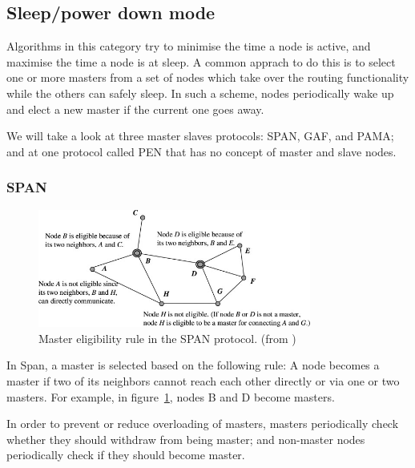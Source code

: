 \subsection{Sleep/power­ down mode}
Algorithms in this category try to minimise the time a node is active, and
maximise the time a node is at sleep. A common apprach to do this is to select
one or more masters from a set of nodes which take over the routing functionality
while the others can safely sleep. In such a scheme, nodes periodically wake up
and elect a new master if the current one goes away.

We will take a look at three master slaves protocols: SPAN, GAF, and PAMA;
and at one protocol called PEN that has no concept of master and slave nodes.

\subsubsection{SPAN}
\begin{figure}
\centering
\includegraphics[width=0.8\textwidth]{images/span-master-example}
\caption{Master eligibility rule in the SPAN protocol. (from \cite{alotaibi2012survey})}
\label{spanmaster}
\end{figure}
In Span\cite{chen2002span}, a master is selected based on the following rule:
A node becomes a master if two of its neighbors cannot reach each other directly
or via one or two masters. For example, in figure~\ref{spanmaster}, nodes B and
D become masters.

In order to prevent or reduce overloading of masters, masters periodically
check whether they should withdraw from being master; and non-master nodes
periodically check if they should become master.


